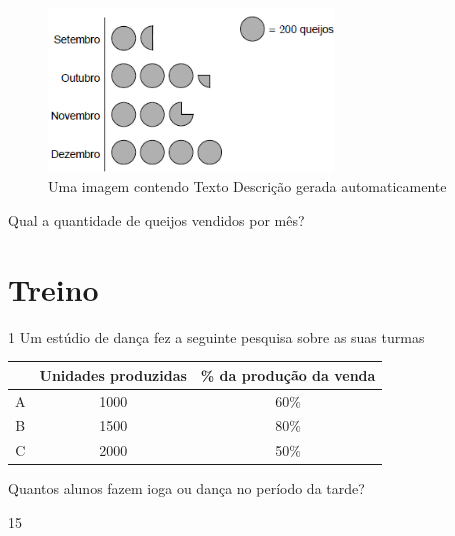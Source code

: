 \begin{escolha}
\begin{escolha}
\begin{escolha}
\begin{escolha}
{\begin{boxmedio}
\begin{boxpeq}
\begin{q°}
\begin{boxmedio}
\begin{boxpeq}
\begin{boxpeq}
\begin{boxmedio}
\begin{boxmedio}
\begin{boxmedio}
\begin{largebox}
\begin{boxmedio}
\begin{figure}
\centering
\includegraphics[width=2.97917in,height=1.71639in]{./_SAEB_9_MAT/media/image223.png}
\caption{Uma imagem contendo Texto Descrição gerada automaticamente}
\end{figure}


Qual a quantidade de queijos vendidos por mês?


\section{Treino}

\num{1}
  Um estúdio de dança fez a seguinte pesquisa sobre as suas turmas 

\begin{table}[]
\begin{tabular}{c|c|c}
\hline
\rowcolor[HTML]{C0C0C0} 
\multicolumn{1}{|c|}{\cellcolor[HTML]{C0C0C0}\textbf{Montadora}} & \textbf{Unidades produzidas} & \multicolumn{1}{c|}{\cellcolor[HTML]{C0C0C0}\textbf{\% da produção da venda}} \\ \hline
A & 1000 & 60\% \\ \hline
B & 1500 & 80\% \\ \hline
C & 2000 & 50\% \\ \hline
\end{tabular}
\end{table}

Quantos alunos fazem ioga ou dança no período da tarde?

\begin{escolha}

  \item 15


\end{escolha}
\end{boxmedio}
\end{largebox}
\end{boxmedio}
\end{boxmedio}
\end{boxmedio}
\end{boxpeq}
\end{boxpeq}
\end{boxmedio}
\end{q°}
\end{boxpeq}
\end{boxmedio}}
\end{escolha}
\end{escolha}
\end{escolha}
\end{escolha}
